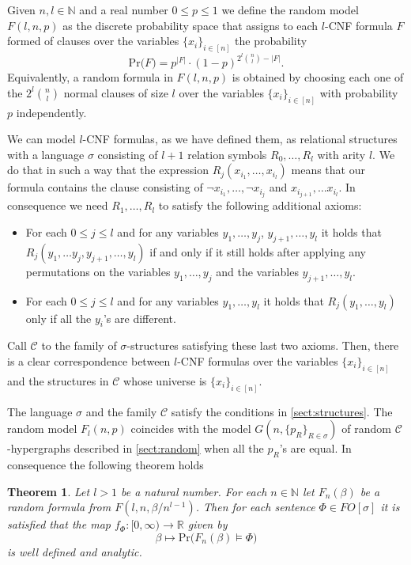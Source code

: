 \documentclass[12pt,notitlepage,a4paper]{article}
\newtheorem{theorem}{Theorem}[section]
\theoremstyle{definition}
\newcommand{\R}{\mathbb{R}}
\newcommand{\N}{\mathbb{N}}
\newcommand{\PR}[1]{\mathrm{Pr}\big(#1\big)}
\begin{document}
Given $n, l \in \N$ and a real number $0\leq p \leq 1$ we define
the random model $F(l,n,p)$ as the discrete probability space that
assigns to each $l$-CNF formula $F$ formed of clauses over
the variables $\{x_i\}_{i\in [n]}$
 the probability
\[
\PR{F}= p^{|F|}\cdot (1-p)^{2^l\binom{n}{l}-|F|}.
\] 
Equivalently, a random formula in $F(l,n,p)$ is obtained
by choosing each one of the $2^l\binom{n}{l}$ normal 
clauses of size $l$ over the variables $\{x_i\}_{i\in [n]}$
with probability $p$ independently. \par	
We can model $l$-CNF formulas, as we have defined them, as relational 
structures with a language $\sigma$ consisting of $l+1$ relation symbols
$R_0,\dots, R_l$ with arity $l$. We do that in such a way that the expression
$R_j(x_{i_1},\dots,x_{i_l})$ means that our formula contains the clause
consisting of $\neg x_{i_1}, \dots, \neg x_{i_j}$ and $x_{i_{j+1}},\dots
x_{i_l}$. In consequence we need $R_1,\dots, R_l$ to satisfy the 
following additional axioms:
\begin{itemize}
	\item For each $0\leq j \leq l$ and 
	for any variables $y_1,\dots,y_j$, $y_{j+1},\dots, y_l$ it holds that
	 $R_j(y_1,\dots y_j, y_{j+1},\dots, y_l)$ if and only if it still holds after 
	 applying any permutations on the variables $y_1,\dots,y_j$ and the variables
	 $y_{j+1},\dots,y_l$.
	 \item For each $0\leq j \leq l$ and 
	 for any variables $y_1,\dots, y_l$ it holds that
	 $R_j(y_1,\dots, y_l)$ only if all the $y_i$'s are different. 
\end{itemize}
Call $\mathcal{C}$ to the family of $\sigma$-structures satisfying these last two axioms.
Then, there is a clear correspondence between $l$-CNF formulas over the variables
$\{x_i\}_{i\in [n]}$ and the structures in $\mathcal{C}$ whose universe is 
$\{x_i\}_{i\in [n]}$. \par
The language $\sigma$ and the family $\mathcal{C}$ satisfy the conditions in 
\cref{sect:structures}. The random model $F_l(n,p)$ coincides with the model
$G(n,\{p_R\}_{R\in \sigma})$ of random $\mathcal{C}$-hypergraphs described in 
\cref{sect:random} when all the $p_R$'s are equal. In consequence the following theorem 
holds
\begin{theorem} \label{thm:mainsat}
	Let $l>1$ be a natural number.
	For each $n\in \N$ let $F_n(\beta)$ be a random formula from
	$F(l,n,\beta/n^{l-1})$. Then for each sentence $\Phi\in FO[\sigma]$ 
	it is satisfied
	that the map $f_\Phi: [0,\infty) \rightarrow \R$ given by
	\[
	\beta \mapsto \PR{ F_n(\beta)\models \Phi}
	\]
	is well defined and analytic. 
\end{theorem}
\end{document}
